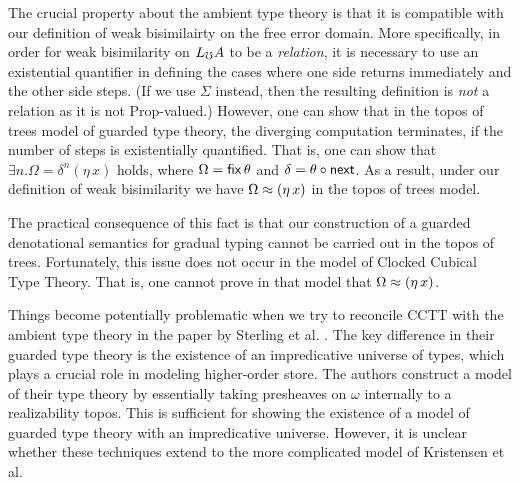\documentclass{article}
\theoremstyle{definition}
\theoremstyle{remark}
\begin{document}


The crucial property about the ambient type theory is that it is compatible with
our definition of weak bisimilairty on the free error domain. More specifically,
in order for weak bisimilarity on $L_\mho A$ to be a \emph{relation}, it is
necessary to use an existential quantifier in defining the cases where one side
returns immediately and the other side steps. (If we use $\Sigma$ instead, then
the resulting definition is \emph{not} a relation as it is not Prop-valued.)
%
However, one can show that in the topos of trees model of guarded type theory,
the diverging computation terminates, if the number of steps is existentially
quantified. That is, one can show that $\exists n. \Omega = \delta^n(\eta\, x)$
holds, where $\Omega = \mathsf{fix}\, \theta$ and $\delta = \theta \circ \mathsf{next}$.
%
As a result, under our definition of weak bisimilarity we have $\Omega \approx
(\eta\, x)$ in the topos of trees model.


The practical consequence of this fact is that our construction of a guarded
denotational semantics for gradual typing cannot be carried out in the topos of
trees. Fortunately, this issue does not occur in the model of Clocked Cubical
Type Theory. That is, one cannot prove in that model that $\Omega \approx (\eta\,
x)$.

Things become potentially problematic when we try to reconcile CCTT with the
ambient type theory in the paper by Sterling et al.
\cite{DBLP:journals/corr/abs-2210-02169}. The key difference in their guarded
type theory is the existence of an impredicative universe of types, which plays
a crucial role in modeling higher-order store.
%
The authors construct a model of their type theory by essentially taking
presheaves on $\omega$ internally to a realizability topos. This is sufficient
for showing the existence of a model of guarded type theory with an
impredicative universe. However, it is unclear whether these techniques extend
to the more complicated model of Kristensen et al.
\end{document}
